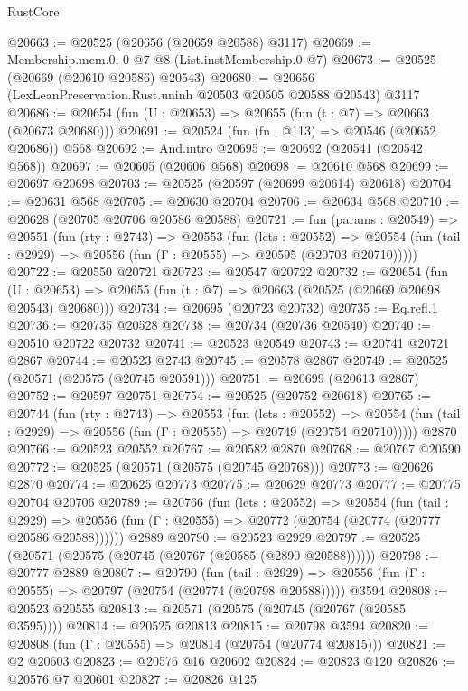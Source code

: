 \begin{lexlean}{RustCore}
\begin{coremodule}
@20663 := @20525 (@20656 (@20659 @20588) @3117)
@20669 := Membership.mem.{0, 0} @7 @8 (List.instMembership.{0} @7)
@20673 := @20525 (@20669 (@20610 @20586) @20543)
@20680 := @20656 (LexLeanPreservation.Rust.uninh @20503 @20505 @20588 @20543) @3117
@20686 := @20654 (fun (U : @20653) => @20655 (fun (t : @7) => @20663 (@20673 @20680)))
@20691 := @20524 (fun (fn : @113) => @20546 (@20652 @20686)) @568
@20692 := And.intro
@20695 := @20692 (@20541 (@20542 @568))
@20697 := @20605 (@20606 @568)
@20698 := @20610 @568
@20699 := @20697 @20698
@20703 := @20525 (@20597 (@20699 @20614) @20618)
@20704 := @20631 @568
@20705 := @20630 @20704
@20706 := @20634 @568
@20710 := @20628 (@20705 @20706 @20586 @20588)
@20721 := fun (params : @20549) =>
  @20551
    (fun (rty : @2743) =>
    @20553
      (fun (lets : @20552) =>
      @20554 (fun (tail : @2929) => @20556 (fun (Γ : @20555) => @20595 (@20703 @20710)))))
@20722 := @20550 @20721
@20723 := @20547 @20722
@20732 := @20654
    (fun (U : @20653) => @20655 (fun (t : @7) => @20663 (@20525 (@20669 @20698 @20543) @20680)))
@20734 := @20695 (@20723 @20732)
@20735 := Eq.refl.{1}
@20736 := @20735 @20528
@20738 := @20734 (@20736 @20540)
@20740 := @20510 @20722 @20732
@20741 := @20523 @20549
@20743 := @20741 @20721 @2867
@20744 := @20523 @2743
@20745 := @20578 @2867
@20749 := @20525 (@20571 (@20575 (@20745 @20591)))
@20751 := @20699 (@20613 @2867)
@20752 := @20597 @20751
@20754 := @20525 (@20752 @20618)
@20765 := @20744
    (fun (rty : @2743) =>
    @20553
      (fun (lets : @20552) =>
      @20554 (fun (tail : @2929) => @20556 (fun (Γ : @20555) => @20749 (@20754 @20710)))))
    @2870
@20766 := @20523 @20552
@20767 := @20582 @2870
@20768 := @20767 @20590
@20772 := @20525 (@20571 (@20575 (@20745 @20768)))
@20773 := @20626 @2870
@20774 := @20625 @20773
@20775 := @20629 @20773
@20777 := @20775 @20704 @20706
@20789 := @20766
    (fun (lets : @20552) =>
    @20554
      (fun (tail : @2929) =>
      @20556 (fun (Γ : @20555) => @20772 (@20754 (@20774 (@20777 @20586 @20588))))))
    @2889
@20790 := @20523 @2929
@20797 := @20525 (@20571 (@20575 (@20745 (@20767 (@20585 (@2890 @20588))))))
@20798 := @20777 @2889
@20807 := @20790
    (fun (tail : @2929) => @20556 (fun (Γ : @20555) => @20797 (@20754 (@20774 (@20798 @20588)))))
    @3594
@20808 := @20523 @20555
@20813 := @20571 (@20575 (@20745 (@20767 (@20585 @3595))))
@20814 := @20525 @20813
@20815 := @20798 @3594
@20820 := @20808 (fun (Γ : @20555) => @20814 (@20754 (@20774 @20815)))
@20821 := @2 @20603
@20823 := @20576 @16 @20602
@20824 := @20823 @120
@20826 := @20576 @7 @20601
@20827 := @20826 @125

\end{coremodule}
\end{lexlean}
